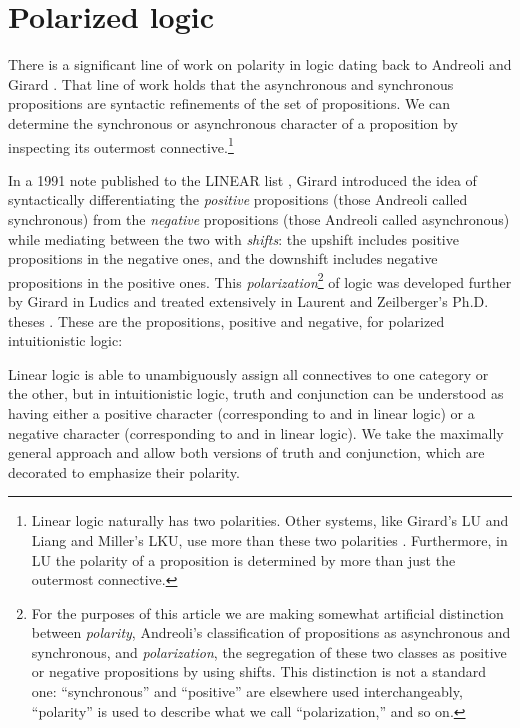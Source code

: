 \documentclass[acmtocl]{robtrans}\pdfoutput=1
\begin{document}
\section{Polarized logic}
\label{sec:logic}

There is a significant line of work on polarity in logic dating back
to Andreoli  and Girard
. That line of work holds that 
the asynchronous and
synchronous propositions are syntactic refinements of the set of
propositions. We can determine the synchronous or asynchronous
character of a proposition by inspecting its outermost
connective.\footnote{Linear logic naturally has two polarities. Other
  systems, like Girard's LU and Liang and Miller's LKU, use more than
  these two polarities
  \cite{girard93unity,liang11focused}. Furthermore, in LU the polarity
  of a proposition is determined by more than just the outermost
  connective.}

In a 1991 note published to the LINEAR list \cite{girard91sex}, Girard
introduced the idea of syntactically differentiating the {\it
  positive} propositions (those Andreoli called synchronous) from the
{\it negative} propositions (those Andreoli called asynchronous) while
mediating between the two with {\it shifts}: the upshift
 includes positive propositions in the negative ones,
and the downshift  includes negative propositions in
the positive ones. This {\it polarization}\footnote{For the purposes
  of this article we are making somewhat artificial distinction
  between {\it polarity}, Andreoli's classification of propositions as
  asynchronous and synchronous, and {\it polarization}, the
  segregation of these two classes as positive or negative
  propositions by using shifts. This distinction is not a standard
  one: ``synchronous'' and ``positive'' are elsewhere used
  interchangeably, ``polarity'' is used to describe what we call
  ``polarization,'' and so on.} of logic was developed further by
Girard in Ludics \cite{girard01locus} and treated extensively in
Laurent and Zeilberger's Ph.D. theses
\cite{laurent02etude,zeilberger09logical}.
These are the propositions, positive and negative, for polarized
intuitionistic logic:


Linear logic is able to unambiguously assign all connectives
to one category or the other, but in intuitionistic logic, truth
 and conjunction 
can be understood as having either a positive character (corresponding to
 and  in linear logic) or a negative character
(corresponding to  and  in linear logic). 
We take the maximally general approach and allow both versions of 
truth and conjunction, which are decorated to emphasize their polarity.
\end{document}
